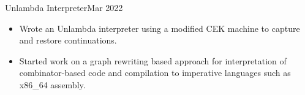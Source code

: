 \documentclass[a4paper]{article}
\begin{document}

    \begin{activity}{Unlambda Interpreter}{Mar 2022}
      \begin{itemize}[topsep=5pt, partopsep=0pt, itemsep=-1pt]
        \item Wrote an Unlambda interpreter using a modified CEK machine to capture and restore continuations.
        \item Started work on a graph rewriting based approach for interpretation of combinator-based code and compilation to imperative languages such as x86\_64 assembly.
      \end{itemize}
    \end{activity}

\end{document}
